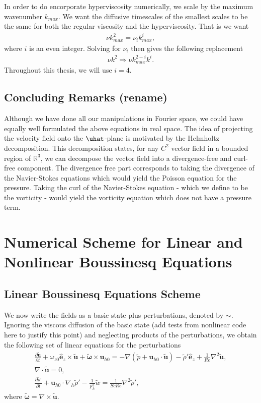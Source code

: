 In order to do encorporate hyperviscosity numerically, we scale by the maximum wavenumber $k_{max}$. We want the diffusive timescales of the smallest scales to be the same for both the regular viscosity and the hyperviscosity. That is we want 
\begin{align}
\nu k_{max}^{2} = \nu_{i}k_{max}^{i},
\end{align}
where $i$ is an even integer. Solving for $\nu_{i}$ then gives the following replacement
\begin{align}
\nu k^{2} \Rightarrow \nu k_{max}^{2-i}k^{i}.
\end{align}
Throughout this thesis, we will use $i=4$. 

\subsection{Concluding Remarks (rename)}
Although we have done all our manipulations in Fourier space, we could have equally well formulated the above equations in real space. The idea of projecting the velocity field onto the $\uhat$-plane is motivated by the Helmholtz decomposition. This decomposition states, for any $C^{2}$ vector field in a bounded region of $\mathbb{R}^{3}$, we can decompose the vector field into a divergence-free and curl-free component. The divergence free part corresponds to taking the divergence of the Navier-Stokes equations which would yield the Poisson equation for the pressure. Taking the curl of the Navier-Stokes equation - which we define to be the vorticity - would yield the vorticity equation which does not have a pressure term.


\section{Numerical Scheme for Linear and Nonlinear Boussinesq Equations}
\subsection{Linear Boussinesq Equations Scheme}
We now write the fields as a basic state plus perturbations, denoted by $\sim$. Ignoring the viscous diffusion of the basic state \cite{drazinreid} (add tests from nonlinear code here to justify this point) and neglecting products of the perturbations, we obtain the following set of linear equations for the perturbations
\begin{align}
\frac{\partial \tilde{\bm{u}}}{\partial t} + \omega_{z0}\hat{\bm{e}}_{z}\times \tilde{\bm{u}}+\tilde{\boldsymbol{\omega}}\times \bm{u}_{h0} = -\nabla(\tilde{p}+\bm{u}_{h0} \cdot \tilde{\bm{u}}) - \tilde{\rho}'\hat{\bm{e}}_{z} + \frac{1}{Re}\nabla^{2}\tilde{\bm{u}},\label{nsl1}\\
\nabla\cdot\tilde{\bm{u}}=0,\\
\frac{\partial \tilde{\rho}'}{\partial t} + \bm{u}_{h0}\cdot \nabla_{h}\tilde{\rho}'-\frac{1}{F_{h}^{2}}\tilde{w} = \frac{1}{ScRe}\nabla^{2}\tilde{\rho}',\label{nsl3}
\end{align}
where $\tilde{\boldsymbol{\omega}}=\nabla \times \tilde{\bm{u}}$.

